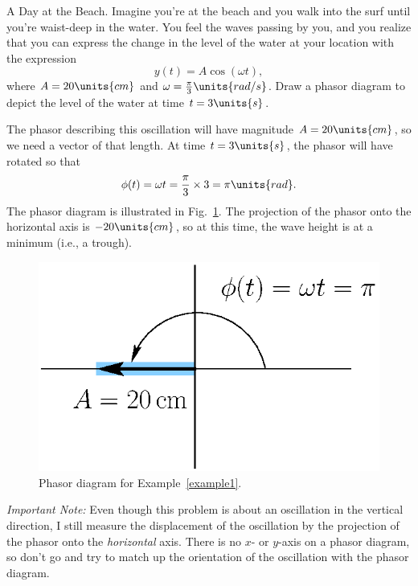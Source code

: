\begin{example}{A Day at the Beach.} 
\label{example1}
Imagine you're at the beach and you walk into the surf
until you're waist-deep in the water. You feel the waves passing by
you, and you realize that you can express the change in the level of
the water at your location with the expression
\begin{equation}
y(t) = A\cos{(\omega t)},
\end{equation} 
where $A = 20\units{cm}$ and $\omega = \frac{\pi}{3}\units{rad/s}$.
Draw a phasor diagram to depict the level of the water at time
$t = 3\units{s}$.
\begin{solution}
The phasor describing this oscillation will have magnitude $A = 20\units{cm}$,
so we need a vector of that length. At time $t = 3\units{s}$, the
phasor will have rotated so that
\begin{equation}
\phi (t) = \omega t = \frac{\pi}{3}\times 3 = \pi\units{rad}. 
\end{equation}
The phasor diagram is illustrated in Fig.~\ref{fig:phasor05}. 
\noindent The projection of the phasor onto the horizontal axis is
$-20\units{cm}$, so at this time, the wave height is at a minimum
(i.e., a trough).

\begin{figure}
\begin{center}
 \includegraphics[width=2.5truein]{phasors/phasor05} 
\caption{Phasor diagram for Example~\ref{example1}.
\label{fig:phasor05}}
\end{center}
\end{figure}


{\em Important Note:} Even though this problem is about an oscillation
in the vertical direction, I still measure the displacement of the
oscillation by the projection of the phasor onto the {\em horizontal}
axis. There is no $x$-  or $y$-axis on a phasor diagram, so don't go
and try to match up the orientation of the oscillation with the phasor
diagram.
\end{solution}
\end{example}


